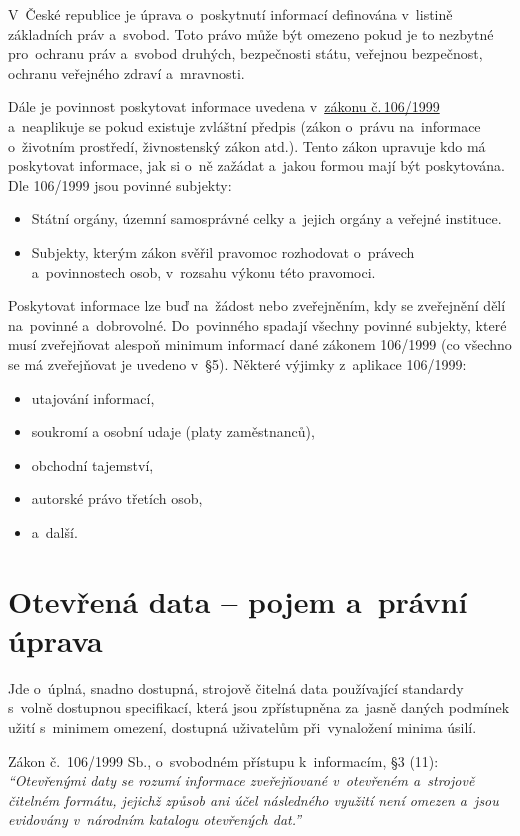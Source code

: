 V~České republice je úprava o~poskytnutí informací definována v~listině základních práv a~svobod. Toto právo může být omezeno pokud je to nezbytné pro~ochranu práv a~svobod druhých, bezpečnosti státu, veřejnou bezpečnost, ochranu veřejného zdraví a~mravnosti.

Dále je povinnost poskytovat informace uvedena v~\href{https://www.zakonyprolidi.cz/cs/1999-106}{zákonu č.\,106/1999} a~neaplikuje se pokud existuje zvláštní předpis (zákon o~právu na~informace o~životním prostředí, živnostenský zákon atd.). Tento zákon upravuje kdo má poskytovat informace, jak si o~ně zažádat a~jakou formou mají být poskytována. Dle 106/1999 jsou povinné subjekty:

\begin{itemize}
    \item Státní orgány, územní samosprávné celky a~jejich orgány a veřejné instituce.
    \item Subjekty, kterým zákon svěřil pravomoc rozhodovat o~právech a~povinnostech osob, v~rozsahu výkonu této pravomoci.
\end{itemize}

Poskytovat informace lze buď na~žádost nebo zveřejněním, kdy se zveřejnění dělí na~povinné a~dobrovolné. Do~povinného spadají všechny povinné subjekty, které musí zveřejňovat alespoň minimum informací dané zákonem 106/1999 (co všechno se má zveřejňovat je uvedeno v~§5). Některé výjimky z~aplikace 106/1999:

\begin{itemize}
    \item utajování informací,
    \item soukromí a osobní udaje (platy zaměstnanců),
    \item obchodní tajemství,
    \item autorské právo třetích osob,
    \item a~další.
\end{itemize}

\clearpage
\section{Otevřená data -- pojem a~právní úprava}

Jde o~úplná, snadno dostupná, strojově čitelná data používající standardy s~volně dostupnou specifikací, která jsou zpřístupněna za~jasně daných podmínek užití s~minimem omezení, dostupná uživatelům při~vynaložení minima úsilí.

Zákon č.~106/1999 Sb., o~svobodném přístupu k~informacím, §3 (11): \emph{\enquote{Otevřenými daty se rozumí informace zveřejňované v~otevřeném a~strojově čitelném formátu, jejichž způsob ani účel následného využití není omezen a~jsou evidovány v~národním katalogu otevřených dat.}}

